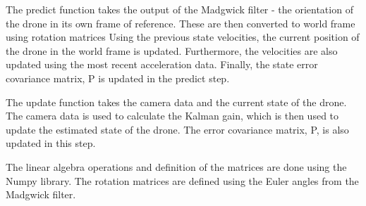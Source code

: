 \documentclass[bare_jrnl_transmag]{subfiles}
\begin{document}
The predict function takes the output of the Madgwick filter - the orientation of the drone in its own frame of reference. These are then converted to world frame using rotation matrices Using the previous state velocities, the current position of the drone in the world frame is updated. Furthermore, the velocities are also updated using the most recent acceleration data. Finally, the state error covariance matrix, P is updated in the predict step. \newline

The update function takes the camera data and the current state of the drone. The camera data is used to calculate the Kalman gain, which is then used to update the estimated state of the drone. The error covariance matrix, P, is also updated in this step.\newline

The linear algebra operations and definition of the matrices are done using the Numpy library. The rotation matrices are defined using the Euler angles from the Madgwick filter. 
\end{document}

